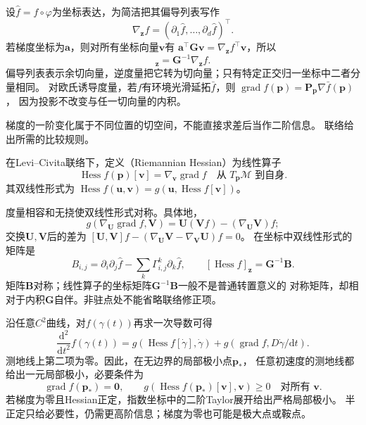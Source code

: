 设$\widehat f=f\circ\varphi$为坐标表达，为简洁把其偏导列表写作
\[
 \nabla_{\bm z}f=(\partial_1\widehat f,\ldots,\partial_d\widehat f)^\top.
\]
若梯度坐标为$\bm a$，则对所有坐标向量$\bm v$有
$\bm a^\top\bm G\bm v=\nabla_{\bm z}f^\top\bm v$，所以
\begin{equation}
 [\operatorname{grad}f]_{\bm z}=\bm G^{-1}\nabla_{\bm z}f.
 \label{eq:geometry-riemannian-gradient-coordinates}
\end{equation}
偏导列表表示余切向量，逆度量把它转为切向量；只有特定正交归一坐标中二者分量相同。
对欧氏诱导度量，若$f$有环境光滑延拓$\bar f$，则
$\operatorname{grad}f(\bm p)=\bm P_{\bm p}\nabla\bar f(\bm p)$，
因为投影不改变与任一切向量的内积。

梯度的一阶变化属于不同位置的切空间，不能直接求差后当作二阶信息。
联络给出所需的比较规则。
\begin{definition}
\label{def:geometry-riemannian-hessian}
在Levi--Civita联络下，定义（Riemannian Hessian）为线性算子
\[
 \operatorname{Hess}f(\bm p)[\bm v]
 =\nabla_{\bm v}\operatorname{grad}f
 \quad\text{从 }T_{\bm p}\mathcal M\text{ 到自身}.
\]
其双线性形式为
$\operatorname{Hess}f(\bm u,\bm v)
=g(\bm u,\operatorname{Hess}f[\bm v])$。
\end{definition}
度量相容和无挠使双线性形式对称。具体地，
\[
 g(\nabla_{\bm U}\operatorname{grad}f,\bm V)
 =\bm U(\bm V f)-(\nabla_{\bm U}\bm V)f;
\]
交换$\bm U,\bm V$后的差为
$[\bm U,\bm V]f-(\nabla_{\bm U}\bm V-\nabla_{\bm V}\bm U)f=0$。
在坐标中双线性形式的矩阵是
\begin{equation}
 B_{i,j}=\partial_i\partial_j\widehat f
             -\sum_k\Gamma^k_{i,j}\partial_k\widehat f,
 \qquad [\operatorname{Hess}f]_{\bm z}=\bm G^{-1}\bm B.
 \label{eq:geometry-hessian-coordinates}
\end{equation}
矩阵$\bm B$对称；线性算子的坐标矩阵$\bm G^{-1}\bm B$一般不是普通转置意义的
对称矩阵，却相对于内积$\bm G$自伴。非驻点处不能省略联络修正项。

沿任意$C^2$曲线，对$f(\gamma(t))$再求一次导数可得
\begin{equation}
 \frac{\mathrm d^2}{\mathrm dt^2}f(\gamma(t))
 =g(\operatorname{Hess}f[\dot\gamma],\dot\gamma)
   +g(\operatorname{grad}f,D\dot\gamma/\mathrm dt).
 \label{eq:geometry-function-second-derivative}
\end{equation}
测地线上第二项为零。因此，在无边界的局部极小点$\bm p_*$，
任意初速度的测地线都给出一元局部极小，必要条件为
\[
 \operatorname{grad}f(\bm p_*)=\bm0,\qquad
 g(\operatorname{Hess}f(\bm p_*)[\bm v],\bm v)\geq0
 \quad\text{对所有 }\bm v.
\]
若梯度为零且Hessian正定，指数坐标中的二阶Taylor展开给出严格局部极小。
半正定只给必要性，仍需更高阶信息；梯度为零也可能是极大点或鞍点。

